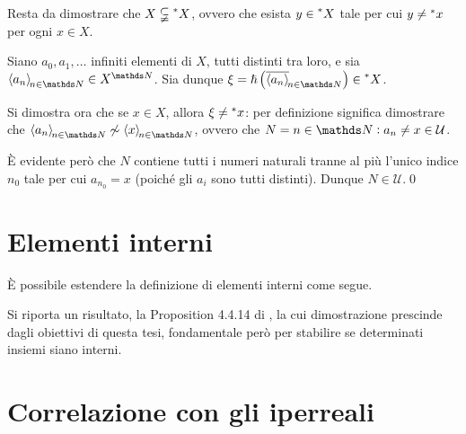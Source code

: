{    Resta da dimostrare che $ X \subsetneqq \prescript{*}{}{X} $, ovvero che esista $ y \in \prescript{*}{}{X} $ tale per cui $ y\neq \prescript{*}{}{x} $ per ogni $ x \in X $. 

    Siano $ a_0,a_1,\dots $ infiniti elementi di $ X $, tutti distinti tra loro, e sia $ \sequence{a_{n} } \in X^{\N} $. Sia dunque $ \xi = \hslash\left(\filtersequence{a_{n}}\right) \in \nonstandard{X} $.

    Si dimostra ora che se $ x \in X $, allora $ \xi\neq \prescript{*}{}{x} $: per definizione significa dimostrare che $ \sequence{a_{n} }\mathrel{\not\sim} \sequence{x} $, ovvero che $ N={n \in \N: a_{n}\neq x } \in \mathcal{U} $. 

    È evidente però che $ N $ contiene tutti i numeri naturali tranne al più l'unico indice $ n_0 $ tale per cui $ a_{n_0}= x  $ (poiché gli $ a_i $ sono tutti distinti). Dunque $ N \in  \mathcal{U} $.\qed
}

\section{Elementi interni}

È possibile estendere la definizione di elementi interni come segue.



Si riporta un risultato, la Proposition 4.4.14 di \cite{chang_model_2012}, la cui dimostrazione prescinde dagli obiettivi di questa tesi, fondamentale però per stabilire se determinati insiemi siano interni. 


\section{Correlazione con gli iperreali}

